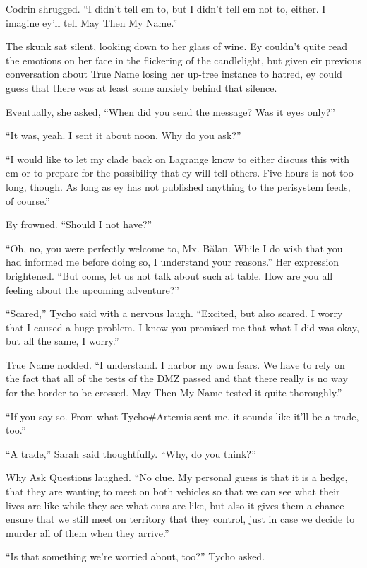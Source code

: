 Codrin shrugged. ``I didn't tell em to, but I didn't tell em not to, either. I imagine ey'll tell May Then My Name.''

The skunk sat silent, looking down to her glass of wine. Ey couldn't quite read the emotions on her face in the flickering of the candlelight, but given eir previous conversation about True Name losing her up-tree instance to hatred, ey could guess that there was at least some anxiety behind that silence.

Eventually, she asked, ``When did you send the message? Was it eyes only?''

``It was, yeah. I sent it about noon. Why do you ask?''

``I would like to let my clade back on Lagrange know to either discuss this with em or to prepare for the possibility that ey will tell others. Five hours is not too long, though. As long as ey has not published anything to the perisystem feeds, of course.''

Ey frowned. ``Should I not have?''

``Oh, no, you were perfectly welcome to, Mx. Bălan. While I do wish that you had informed me before doing so, I understand your reasons.'' Her expression brightened. ``But come, let us not talk about such at table. How are you all feeling about the upcoming adventure?''

``Scared,'' Tycho said with a nervous laugh. ``Excited, but also scared. I worry that I caused a huge problem. I know you promised me that what I did was okay, but all the same, I worry.''

True Name nodded. ``I understand. I harbor my own fears. We have to rely on the fact that all of the tests of the DMZ passed and that there really is no way for the border to be crossed. May Then My Name tested it quite thoroughly.''

``If you say so. From what Tycho\#Artemis sent me, it sounds like it'll be a trade, too.''

``A trade,'' Sarah said thoughtfully. ``Why, do you think?''

Why Ask Questions laughed. ``No clue. My personal guess is that it is a hedge, that they are wanting to meet on both vehicles so that we can see what their lives are like while they see what ours are like, but also it gives them a chance ensure that we still meet on territory that they control, just in case we decide to murder all of them when they arrive.''

``Is that something we're worried about, too?'' Tycho asked.

